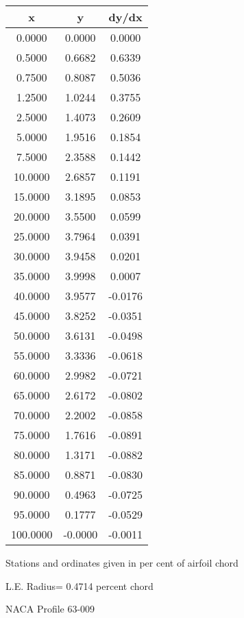 \documentclass[11pt]{book}
\begin{document}
 \vspace{8mm}
 \begin{tabular}{|c|c|c|} \hline 
  x  &  y  &  dy/dx \\
 \hline
0.0000 & 0.0000 & 0.0000 \\
0.5000 & 0.6682 & 0.6339 \\
0.7500 & 0.8087 & 0.5036 \\
1.2500 & 1.0244 & 0.3755 \\
2.5000 & 1.4073 & 0.2609 \\
5.0000 & 1.9516 & 0.1854 \\
7.5000 & 2.3588 & 0.1442 \\
10.0000 & 2.6857 & 0.1191 \\
15.0000 & 3.1895 & 0.0853 \\
20.0000 & 3.5500 & 0.0599 \\
25.0000 & 3.7964 & 0.0391 \\
30.0000 & 3.9458 & 0.0201 \\
35.0000 & 3.9998 & 0.0007 \\
40.0000 & 3.9577 & -0.0176 \\
45.0000 & 3.8252 & -0.0351 \\
50.0000 & 3.6131 & -0.0498 \\
55.0000 & 3.3336 & -0.0618 \\
60.0000 & 2.9982 & -0.0721 \\
65.0000 & 2.6172 & -0.0802 \\
70.0000 & 2.2002 & -0.0858 \\
75.0000 & 1.7616 & -0.0891 \\
80.0000 & 1.3171 & -0.0882 \\
85.0000 & 0.8871 & -0.0830 \\
90.0000 & 0.4963 & -0.0725 \\
95.0000 & 0.1777 & -0.0529 \\
100.0000 & -0.0000 & -0.0011 \\
 \hline
 \end{tabular}
 \vspace{8mm}


Stations and ordinates given in per cent of airfoil chord 


L.E. Radius=  0.4714 percent chord
 \newpage
  \label{p63-009}
 \begin{Large}
 NACA Profile 63-009
 \end{Large}
  
\end{document}
